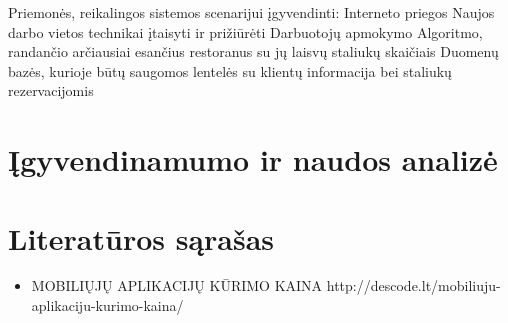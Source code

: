 \documentclass{VUMIFPSkursinis}
\begin{document}
Priemonės, reikalingos sistemos scenarijui įgyvendinti:
Interneto priegos
Naujos darbo vietos technikai įtaisyti ir prižiūrėti
Darbuotojų apmokymo
Algoritmo, randančio arčiausiai esančius restoranus su jų laisvų staliukų skaičiais
Duomenų bazės, kurioje būtų saugomos lentelės su klientų informacija bei staliukų rezervacijomis

\section{Įgyvendinamumo ir naudos analizė}

\section{Literatūros sąrašas}
\begin{itemize}
\item MOBILIŲJŲ APLIKACIJŲ KŪRIMO KAINA http://descode.lt/mobiliuju-aplikaciju-kurimo-kaina/
\end{itemize}
\end{document}
